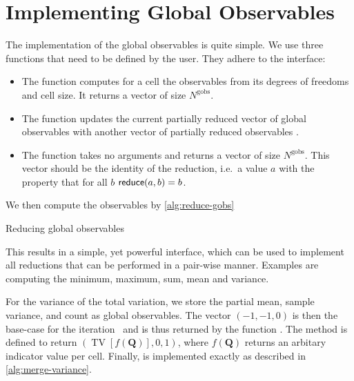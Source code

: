 \section{Implementing Global Observables}
\newcommand{\ngobs}{N^{\text{gobs}}}
The implementation of the global observables is quite simple.
We use three functions that need to be defined by the user.
They adhere to the interface:
\begin{itemize}
\item The function  computes for a cell the observables from its degrees of freedoms and cell size.
  It returns a vector of size $\ngobs$.
\item The function  updates the current partially reduced vector of global observables  with another vector of partially reduced observables .
\item The function  takes no arguments and returns a vector of size $\ngobs$.
  This vector should be the identity of the reduction, i.e.\ a value $a$ with the property that for all $b$ $\textsf{reduce}(a, b) = b$.
\end{itemize}
We then compute the observables by \cref{alg:reduce-gobs}
\begin{algorithm}[htb]
  \begin{algorithmic}
    \EndFor{}
    \State{}
  \end{algorithmic}
  \caption{\label{alg:reduce-gobs}Reducing global observables}
\end{algorithm}
This results in a simple, yet powerful interface, which can be used to implement all reductions that can be performed in a pair-wise manner.
Examples are computing the minimum, maximum, sum, mean and variance.

For the variance of the total variation, we store the partial mean, sample variance, and count as global observables.
The vector $(-1, -1, 0)$ is then the base-case for the iteration~ and is thus returned by the function .
The method  is defined to return $\left( \operatorname{TV} \left[ f(\bm{Q}) \right], 0, 1 \right)$, where $f(\bm{Q})$ returns an arbitary indicator value per cell.
Finally,  is implemented exactly as described in \cref{alg:merge-variance}.


